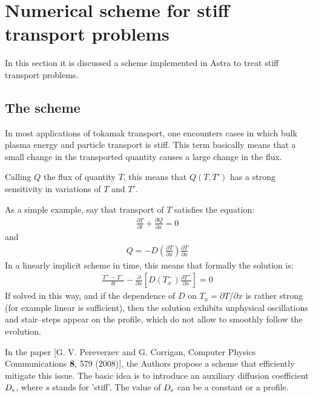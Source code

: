 
\section{Numerical scheme for stiff transport problems}
In this section it is discussed a scheme implemented in Astra to treat stiff transport problems.
%
\subsection{The scheme}
In most applications of tokamak transport, one encounters cases in which bulk plasma energy and
particle transport is stiff. This term basically means that a small change in the transported quantity
causes a large change in the flux.

Calling $Q$ the flux of quantity $T$, this means that $Q(T,T')$ has a strong sensitivity in variations
of $T$ and $T'$. 

As a simple example, say that transport of $T$ satisfies the equation:
\begin{eqnarray}
\frac{\partial T}{\partial t} + \frac{\partial Q}{\partial x} =0
\end{eqnarray}
and 
\begin{eqnarray}
Q = - D\left(\frac{\partial T}{ \partial x}\right)\frac{\partial T}{\partial x} 
\end{eqnarray}
In a linearly implicit scheme in time, this means that formally the solution is:
\begin{eqnarray}
\frac{T^+-T^-}{\delta t} - \frac{\partial }{\partial x}\left[D(T_x^-)\frac{\partial T^+}{\partial x}\right] =0
\end{eqnarray}
If solved in this way, and if the dependence of $D$ on $T_x=\partial T/\partial x$ is rather strong (for example linear is sufficient),
then the solution exhibits unphysical oscillations and stair--steps appear on the profile, which do not allow to
smoothly follow the evolution.

In the paper [G. V. Pereverzev and G. Corrigan, Computer Physics Communications {\bf 8}, 579 (2008)], the
Authors propose a scheme that efficiently mitigate this issue.
The basic idea is to introduce an auxiliary diffusion coefficient $D_{\rm s}$, where $s$ stands for 'stiff'. The
value of $D_{\rm s}$ can be a constant or a profile.

